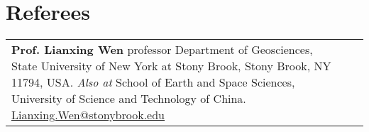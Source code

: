 \section*{Referees}

\begin{tabular}{p{} p{}}
\textbf{Prof. Lianxing Wen} \newline
professor \newline
Department of Geosciences, \newline
State University of New York at Stony Brook, \newline
Stony Brook, NY 11794, USA. \newline
\textit{Also at} School of Earth and Space Sciences, \newline
University of Science and Technology of China. \newline
\href{mailto:Lianxing.Wen@stonybrook.edu}{Lianxing.Wen@stonybrook.edu}
&
~
\\
\end{tabular}
